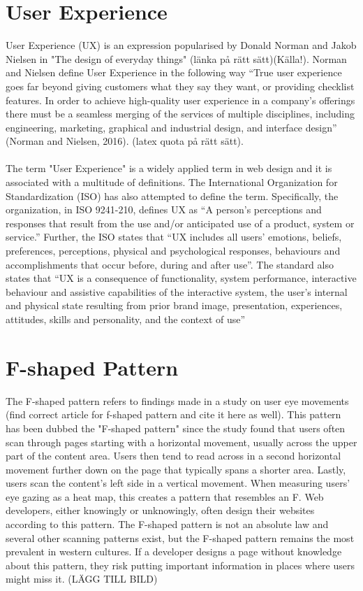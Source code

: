 \section{User Experience}
User Experience (UX) is an expression popularised by Donald Norman and Jakob Nielsen in "The design of everyday things" (länka på rätt sätt)(Källa!). Norman and Nielsen define User Experience in the following way “True user experience goes far beyond giving customers what they say they want, or providing checklist features. In order to achieve high-quality user experience in a company’s offerings there must be a seamless merging of the services of multiple disciplines, including engineering, marketing, graphical and industrial design, and interface design” (Norman and Nielsen, 2016). (latex quota på rätt sätt). 
\\\\
The term "User Experience" is a widely applied term in web design and it is associated with a multitude of definitions. The International Organization for Standardization (ISO) has also attempted to define the term. Specifically, the organization, in ISO 9241-210, defines UX as “A person's perceptions and responses that result from the use and/or anticipated use of a product, system or service.” Further, the ISO states that “UX includes all users' emotions, beliefs, preferences, perceptions, physical and psychological responses, behaviours and accomplishments that occur before, during and after use”. The standard also states that “UX is a consequence of functionality, system performance, interactive behaviour and assistive capabilities of the interactive system, the user's internal and physical state resulting from prior brand image, presentation, experiences, attitudes, skills and personality, and the context of use” 

\section{F-shaped Pattern}
The F-shaped pattern refers to findings made in a study on user eye movements  \cite{pernice2014people} (find correct article for f-shaped pattern and cite it here as well). This pattern has been dubbed the "F-shaped pattern" since the study found that users often scan through pages starting with a horizontal movement, usually across the upper part of the content area. Users then tend to read across in a second horizontal movement further down on the page that typically spans a shorter area. Lastly, users scan the content’s left side in a vertical movement. When measuring users' eye gazing as a heat map, this creates a pattern that resembles an F. Web developers, either knowingly or unknowingly, often design their websites according to this pattern. The F-shaped pattern is not an absolute law and several other scanning patterns exist, but the F-shaped pattern remains the most prevalent in western cultures. \cite{f-shape_today} If a developer designs a page without knowledge about this pattern, they risk putting important information in places where users might miss it. 
(LÄGG TILL BILD)
